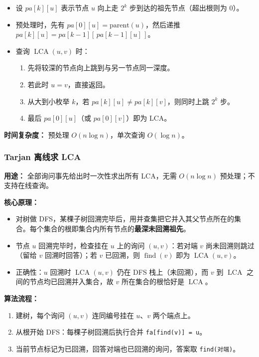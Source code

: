 \begin{itemize}
  \item 设 $pa[k][u]$ 表示节点 $u$ 向上走 $2^k$ 步到达的祖先节点（超出根则为 $0$）。
  \item 预处理时，先有 $pa[0][u] = \text{parent}(u)$，然后递推 $pa[k][u] = pa[k-1][\,pa[k-1][u]\,]$。
  \item 查询 $\operatorname{LCA}(u, v)$ 时：
    \begin{enumerate}
      \item 先将较深的节点向上跳到与另一节点同一深度。
      \item 若此时 $u = v$，直接返回。
      \item 从大到小枚举 $k$，若 $pa[k][u] \neq pa[k][v]$，则同时上跳 $2^k$ 步。
      \item 最后 $pa[0][u]$（或 $pa[0][v]$）即为 LCA。
    \end{enumerate}
\end{itemize}

\textbf{时间复杂度：} 预处理 $O(n \log n)$，单次查询 $O(\log n)$。



\subsubsection{Tarjan 离线求 LCA}

\textbf{用途：} 全部询问事先给出时一次性求出所有 LCA，无需 $O(n \log n)$ 预处理；不支持在线查询。

\textbf{核心原理：}

\begin{itemize}
  \item 对树做 DFS，某棵子树回溯完毕后，用并查集把它并入其父节点所在的集合。每个集合的根即集合内所有节点的\textbf{最深未回溯祖先}。
  \item 节点 $u$ 回溯完毕时，检查挂在 $u$ 上的询问 $(u, v)$：若对端 $v$ 尚未回溯则跳过（留给 $v$ 回溯时回答）；若 $v$ 已回溯，则 $\operatorname{find}(v)$ 即为 $\operatorname{LCA}(u, v)$。
  \item 正确性：$u$ 回溯时 $\operatorname{LCA}(u, v)$ 仍在 DFS 栈上（未回溯），而 $v$ 到 $\operatorname{LCA}$ 之间的节点均已回溯并入集合，故 $v$ 所在集合的根恰好是 $\operatorname{LCA}$。
\end{itemize}

\textbf{算法流程：}
\begin{enumerate}
  \item 建树，每个询问 $(u, v)$ 连同编号挂在 $u$、$v$ 两个端点上。
  \item 从根开始 DFS：每棵子树回溯后执行合并 \texttt{fa[find(v)] = u}。
  \item 当前节点标记为已回溯，回答对端也已回溯的询问，答案取 \texttt{find(对端)}。
\end{enumerate}

